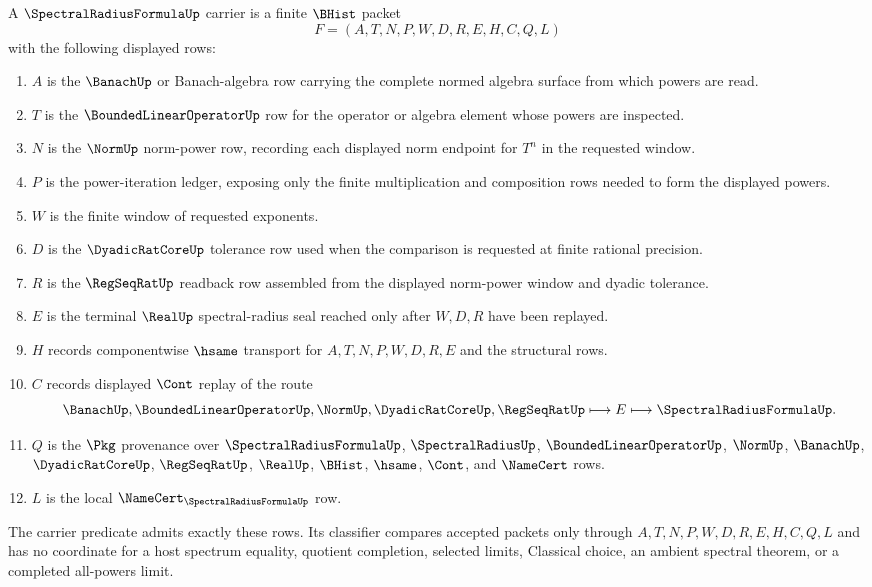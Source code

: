 \begin{definition}
\label{def:spectral-radius-formula-carrier}
A $\SpectralRadiusFormulaUp$ carrier is a finite $\BHist$ packet
$$
F=(A,T,N,P,W,D,R,E,H,C,Q,L)
$$
with the following displayed rows:
\begin{enumerate}
\item $A$ is the $\BanachUp$ or Banach-algebra row carrying the complete normed algebra surface from which powers are read.
\item $T$ is the $\BoundedLinearOperatorUp$ row for the operator or algebra element whose powers are inspected.
\item $N$ is the $\NormUp$ norm-power row, recording each displayed norm endpoint for $T^n$ in the requested window.
\item $P$ is the power-iteration ledger, exposing only the finite multiplication and composition rows needed to form the displayed powers.
\item $W$ is the finite window of requested exponents.
\item $D$ is the $\DyadicRatCoreUp$ tolerance row used when the comparison is requested at finite rational precision.
\item $R$ is the $\RegSeqRatUp$ readback row assembled from the displayed norm-power window and dyadic tolerance.
\item $E$ is the terminal $\RealUp$ spectral-radius seal reached only after $W,D,R$ have been replayed.
\item $H$ records componentwise $\hsame$ transport for $A,T,N,P,W,D,R,E$ and the structural rows.
\item $C$ records displayed $\Cont$ replay of the route
$$
\BanachUp,\BoundedLinearOperatorUp,\NormUp,\DyadicRatCoreUp,\RegSeqRatUp
\longmapsto E
\longmapsto \SpectralRadiusFormulaUp .
$$
\item $Q$ is the $\Pkg$ provenance over $\SpectralRadiusFormulaUp$, $\SpectralRadiusUp$, $\BoundedLinearOperatorUp$, $\NormUp$, $\BanachUp$, $\DyadicRatCoreUp$, $\RegSeqRatUp$, $\RealUp$, $\BHist$, $\hsame$, $\Cont$, and $\NameCert$ rows.
\item $L$ is the local $\NameCert_{\SpectralRadiusFormulaUp}$ row.
\end{enumerate}
The carrier predicate admits exactly these rows. Its classifier compares accepted packets only through $A,T,N,P,W,D,R,E,H,C,Q,L$ and has no coordinate for a host spectrum equality, quotient completion, selected limits, Classical choice, an ambient spectral theorem, or a completed all-powers limit.
\end{definition}


